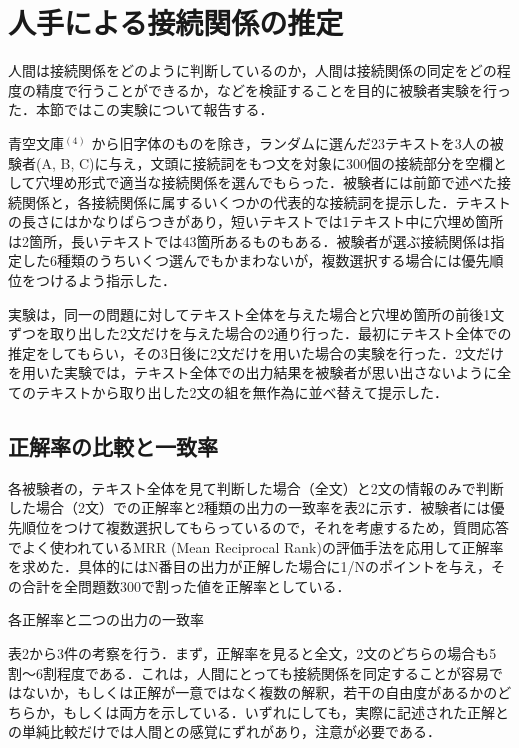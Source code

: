 \documentclass[japanese]{jnlp_1.4}
\begin{document}
\section{人手による接続関係の推定}

人間は接続関係をどのように判断しているのか，人間は接続関係の同定をどの程度の精度で行うことができるか，などを検証することを目的に被験者実験を行った．本節ではこの実験について報告する．

青空文庫$^{(4)}$ から旧字体のものを除き，ランダムに選んだ23テキストを3人の被験者(A, B, C)に与え，文頭に接続詞をもつ文を対象に300個の接続部分を空欄として穴埋め形式で適当な接続関係を選んでもらった．被験者には前節で述べた接続関係と，各接続関係に属するいくつかの代表的な接続詞を提示した．テキストの長さにはかなりばらつきがあり，短いテキストでは1テキスト中に穴埋め箇所は2箇所，長いテキストでは43箇所あるものもある．被験者が選ぶ接続関係は指定した6種類のうちいくつ選んでもかまわないが，複数選択する場合には優先順位をつけるよう指示した．

実験は，同一の問題に対してテキスト全体を与えた場合と穴埋め箇所の前後1文ずつを取り出した2文だけを与えた場合の2通り行った．最初にテキスト全体での推定をしてもらい，その3日後に2文だけを用いた場合の実験を行った．2文だけを用いた実験では，テキスト全体での出力結果を被験者が思い出さないように全てのテキストから取り出した2文の組を無作為に並べ替えて提示した．

\subsection{正解率の比較と一致率}

各被験者の，テキスト全体を見て判断した場合（全文）と2文の情報のみで判断した場合（2文）での正解率と2種類の出力の一致率を表2に示す．被験者には優先順位をつけて複数選択してもらっているので，それを考慮するため，質問応答でよく使われているMRR (Mean Reciprocal Rank)の評価手法を応用して正解率を求めた．具体的にはN番目の出力が正解した場合に1/Nのポイントを与え，その合計を全問題数300で割った値を正解率としている．

\begin{table}[b]
\caption{各正解率と二つの出力の一致率}

\end{table}

表2から3件の考察を行う．まず，正解率を見ると全文，2文のどちらの場合も5割〜6割程度である．これは，人間にとっても接続関係を同定することが容易ではないか，もしくは正解が一意ではなく複数の解釈，若干の自由度があるかのどちらか，もしくは両方を示している．いずれにしても，実際に記述された正解との単純比較だけでは人間との感覚にずれがあり，注意が必要である．
\end{document}
